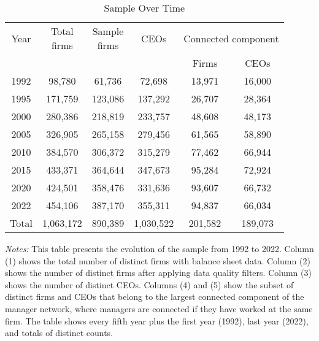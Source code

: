 \begin{table}[htbp]
\centering
\caption{Sample Over Time}
\label{tab:sample}
\begin{tabular}{*{6}{c}}
\toprule
Year & \shortstack{Total\\firms} & \shortstack{Sample\\firms} & CEOs & \multicolumn{2}{c}{Connected component} \\
\cmidrule(lr){5-6}
 & & & & Firms & CEOs \\
\midrule
1992 &       98,780 &       61,736 &       72,698 &       13,971 &       16,000 \\
1995 &      171,759 &      123,086 &      137,292 &       26,707 &       28,364 \\
2000 &      280,386 &      218,819 &      233,757 &       48,608 &       48,173 \\
2005 &      326,905 &      265,158 &      279,456 &       61,565 &       58,890 \\
2010 &      384,570 &      306,372 &      315,279 &       77,462 &       66,944 \\
2015 &      433,371 &      364,644 &      347,673 &       95,284 &       72,924 \\
2020 &      424,501 &      358,476 &      331,636 &       93,607 &       66,732 \\
2022 &      454,106 &      387,170 &      355,311 &       94,837 &       66,034 \\
\midrule
Total &    1,063,172 &      890,389 &    1,030,522 &      201,582 &      189,073 \\
\bottomrule
\end{tabular}
\begin{minipage}{12cm}
\footnotesize
\textit{Notes:} This table presents the evolution of the sample from 1992 to 2022. Column (1) shows the total number of distinct firms with balance sheet data. Column (2) shows the number of distinct firms after applying data quality filters. Column (3) shows the number of distinct CEOs. Columns (4) and (5) show the subset of distinct firms and CEOs that belong to the largest connected component of the manager network, where managers are connected if they have worked at the same firm. The table shows every fifth year plus the first year (1992), last year (2022), and totals of distinct counts. \end{minipage}
\end{table}
